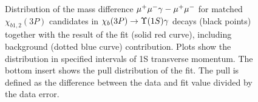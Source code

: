 \begin{figure}[H]
{\begin{picture}
  \end{picture}
  }
  \caption {\small 
    Distribution of the mass difference $\mumu \gamma - \mumu$ for matched
    $\chi_{b1,2}(3P)$ candidates in $\chibThreeP \to \Y1S \gamma$ decays
    (black points) together with the result of the fit (solid red curve),
    including background (dotted blue curve) contribution. Plots show the
    distribution in specified intervals of \Y1S transverse momentum. The bottom
    insert shows the  pull distribution of the fit. The pull is defined as the
    difference  between the data and fit value divided by the data error. }
  \label{fig:mc:ups1s:fits3p}
\end{figure}